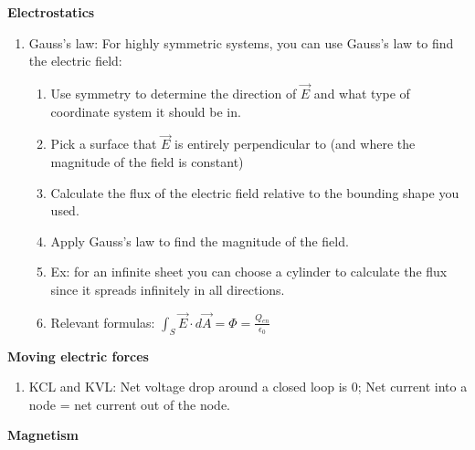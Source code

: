 \documentclass[8pt]{article}
\begin{document}
\textbf{Electrostatics}
\begin{enumerate}
    \item Gauss's law: For highly symmetric systems, you can use Gauss's law to find the electric field:
    \begin{enumerate}
        \item Use symmetry to determine the direction of $\vec{E}$ and what type of coordinate system it should be in.
        \item Pick a surface that $\vec{E}$ is entirely perpendicular to (and where the magnitude of the field is constant)
        \item Calculate the flux of the electric field relative to the bounding shape you used.
        \item Apply Gauss's law to find the magnitude of the field.
        \item Ex: for an infinite sheet you can choose a cylinder to calculate the flux since it spreads infinitely in all directions.
        \item Relevant formulas: $\int_S \vec{E} \cdot d\vec{A} = \Phi = \frac{Q_{en}}{\epsilon_0}$
    \end{enumerate}
\end{enumerate}
\textbf{Moving electric forces}
\begin{enumerate}
    \item KCL and KVL: Net voltage drop around a closed loop is 0; Net current into a node = net current out of the node.
\end{enumerate}
\textbf{Magnetism}
\end{document}
